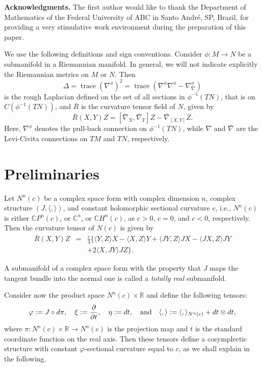 \documentclass[11pt]{amsart}
\theoremstyle{plain}
\theoremstyle{definition}
\DeclareMathOperator{\trace}{trace} \DeclareMathOperator{\di}{div}
\numberwithin{equation}{section}
\begin{document}
\noindent\textbf{Acknowledgments.} The first author would like to thank the Department of Mathematics of the Federal University of ABC in Santo Andr\'e, SP, Brazil, for providing a very stimulative work environment during the preparation of this paper.

 We use the following definitions and sign conventions. Consider $\phi:M\rightarrow N$ be a submanifold in a Riemannian manifold. In general, we will not indicate explicitly the Riemannian metrics on $M$ or $N$. Then 
$$
\Delta=\trace(\nabla^{\phi})^2 =\trace(\nabla^{\phi}\nabla^{\phi}-\nabla^{\phi}_{\nabla})
$$ 
is the rough Laplacian defined on the set of all sections in $\phi^{-1}(TN)$, that is on $C(\phi^{-1}(TN))$, and $\bar R$ is the curvature tensor field of $N$, given by 
$$
\bar R(X,Y)Z=[\bar\nabla_X,\bar\nabla_Y]Z-\bar\nabla_{[X,Y]}Z.
$$
Here, $\nabla^{\phi}$ denotes the pull-back connection on $\phi^{-1}(TN)$, while $\nabla$ and $\bar\nabla$ are the Levi-Civita connections on $TM$ and $TN$, respectively. 


\section{Preliminaries}

Let $N^n(c)$ be a complex space form with complex dimension $n$, complex
structure $(J,\langle,\rangle)$, and constant holomorphic
sectional curvature $c$, i.e., $N^n(c)$ is either $\mathbb{C}P^n(c)$,
or $\mathbb{C}^n$, or $\mathbb{C}H^n(c)$, as $c>0$,
$c=0$, and $c<0$, respectively. Then the curvature tensor of $N(c)$ is given by
\begin{eqnarray}\label{eq:curv_cpn}
\bar R(X,Y)Z&=&\frac{c}{4}\{\langle Y,Z\rangle X-\langle X,Z\rangle Y+\langle JY,Z\rangle JX-\langle JX,Z\rangle JY\\\nonumber &&+2\langle
X,JY\rangle JZ\}.
\end{eqnarray}

A submanifold of a complex space form with the property that $J$ maps the tangent bundle into the normal one is called a \textit{totally real} submanifold.

Consider now the product space $N^n(c)\times\mathbb{R}$ and define the following tensors:
$$
\varphi:=J\circ d\pi,\quad\xi:=\frac{\partial}{\partial t},\quad\eta:=dt,\quad\textnormal{and}\quad
\langle,\rangle:=\langle,\rangle_{N^n(c)}+dt\otimes dt,
$$
where $\pi:N^n(c)\times\mathbb{R}\rightarrow N^n(c)$ is the projection map and $t$ is the standard coordinate function on the real axis. Then these tensors define a cosymplectic structure with constant $\varphi$-sectional curvature equal to $c$, as we shall explain in the following.
\end{document}
